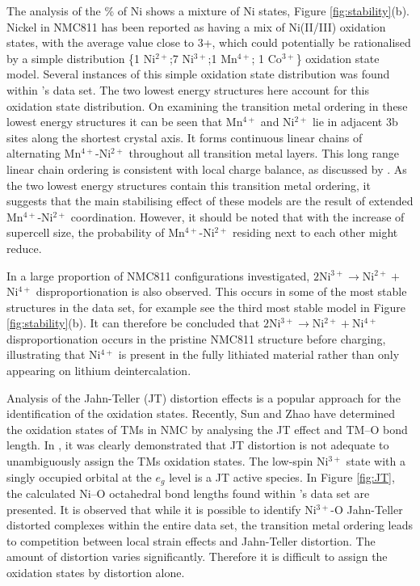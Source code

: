 \documentclass[journal=jacsat,manuscript=article]{achemso}
\begin{document}
The analysis of the \% of Ni shows a mixture of Ni states, Figure \ref{fig:stability}(b). Nickel in NMC811 has been reported as having a mix of Ni(II/III) oxidation states, with the average value close to 3+, \cite{Zhu_JMatChemA2019,Kondrakov_JPhysChemC2017} which could potentially be rationalised by a simple distribution \{1 Ni$^{2+}$;7 Ni$^{3+}$;1 Mn$^{4+}$; 1 Co$^{3+}$\} oxidation state model. Several instances of this simple oxidation state distribution was found within \citeauthor{rana}'s data set. The two lowest energy structures here account for this oxidation state distribution. On examining the transition metal ordering in these lowest energy structures it can be seen that Mn$^{4+}$ and Ni$^{2+}$ lie in adjacent 3b sites along the shortest crystal axis. It forms continuous linear chains of alternating Mn$^{4+}$-Ni$^{2+}$ throughout all transition metal layers. This long range linear chain ordering is consistent with local charge balance, as discussed by \citeauthor{Zeng_ChemMater2007} \cite{Zeng_ChemMater2007}. As the two lowest energy structures contain this transition metal ordering, it suggests that the main stabilising effect of these models are the result of extended Mn$^{4+}$-Ni$^{2+}$ coordination. However, it should be noted that with the increase of supercell size, the probability of Mn$^{4+}$-Ni$^{2+}$ residing next to each other might reduce.

In a large proportion of NMC811 configurations \citeauthor{rana} investigated, $2$Ni$^{3+}\rightarrow$Ni$^{2+} + $Ni$^{4+}$ disproportionation is also observed. This occurs in some of the most stable structures in the data set, for example see the third most stable model in Figure \ref{fig:stability}(b). It can therefore be concluded that $2$Ni$^{3+}\rightarrow$Ni$^{2+} + $Ni$^{4+}$ disproportionation occurs in the pristine NMC811 structure before charging, illustrating that Ni$^{4+}$ is present in the fully lithiated material rather than only appearing on lithium deintercalation.

Analysis of the Jahn-Teller (JT) distortion effects is a popular approach for the identification of the oxidation states. Recently, Sun and Zhao have determined the oxidation states of TMs in NMC by analysing the JT effect and TM–O bond length. \cite{Sun_JPhysChemC2017} In \citeauthor{rana}, it was clearly demonstrated that JT distortion is not adequate to unambiguously assign the TMs oxidation states. The low-spin Ni$^{3+}$ state with a singly occupied orbital at the $e_{g}$ level is a JT active species. In Figure \ref{fig:JT}, the calculated Ni--O octahedral bond lengths found within \citeauthor{rana}'s data set are presented. It is observed that while it is possible to identify Ni$^{3+}$-O Jahn-Teller distorted complexes within the entire data set, the transition metal ordering leads to competition between local strain effects and Jahn-Teller distortion. The amount of distortion varies significantly. Therefore it is difficult to assign the oxidation states by distortion alone.  
\end{document}
